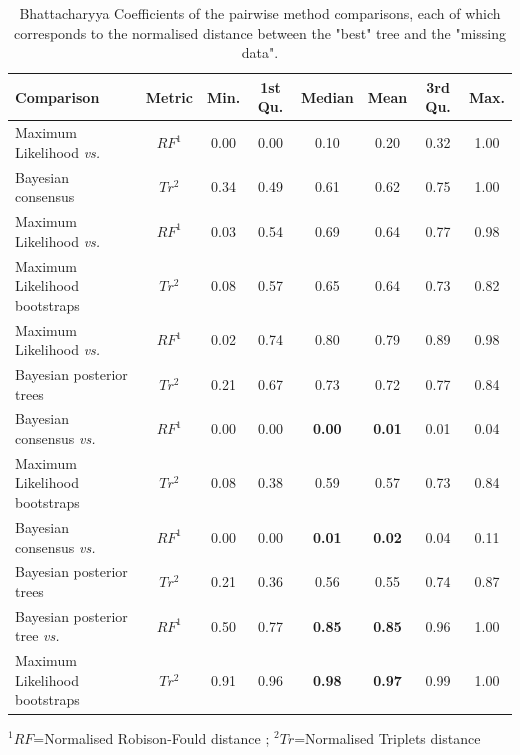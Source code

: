 \documentclass[12pt,letterpaper]{article}
\begin{document}
\begin{table}[ht]
\caption{Bhattacharyya Coefficients of the pairwise method comparisons, each of which corresponds to the normalised distance between the "best" tree and the "missing data".}
\centering
\begin{tabular}{lccccccc}
  \hline
 Comparison &  Metric & Min. & 1st Qu. & Median & Mean & 3rd Qu. & Max. \\ 
  \hline
    Maximum Likelihood \textit{vs.} & $RF^1$ & 0.00 & 0.00 & 0.10 & 0.20 & 0.32 & 1.00 \\ 
    Bayesian consensus              & $Tr^2$ & 0.34 & 0.49 & 0.61 & 0.62 & 0.75 & 1.00 \\ 
    Maximum Likelihood \textit{vs.} & $RF^1$ & 0.03 & 0.54 & 0.69 & 0.64 & 0.77 & 0.98 \\ 
    Maximum Likelihood bootstraps   & $Tr^2$ & 0.08 & 0.57 & 0.65 & 0.64 & 0.73 & 0.82 \\ 
    Maximum Likelihood \textit{vs.} & $RF^1$ & 0.02 & 0.74 & 0.80 & 0.79 & 0.89 & 0.98 \\ 
    Bayesian posterior trees        & $Tr^2$ & 0.21 & 0.67 & 0.73 & 0.72 & 0.77 & 0.84 \\ 
    Bayesian consensus \textit{vs.} & $RF^1$ & 0.00 & 0.00 & \textbf{0.00} & \textbf{0.01} & 0.01 & 0.04 \\ 
    Maximum Likelihood bootstraps   & $Tr^2$ & 0.08 & 0.38 & 0.59 & 0.57 & 0.73 & 0.84 \\ 
    Bayesian consensus \textit{vs.} & $RF^1$ & 0.00 & 0.00 & \textbf{0.01} & \textbf{0.02} & 0.04 & 0.11 \\ 
    Bayesian posterior trees        & $Tr^2$ & 0.21 & 0.36 & 0.56 & 0.55 & 0.74 & 0.87 \\ 
    Bayesian posterior tree \textit{vs.}  & $RF^1$ & 0.50 & 0.77 & \textbf{0.85} & \textbf{0.85} & 0.96 & 1.00 \\ 
    Maximum Likelihood bootstraps   & $Tr^2$ & 0.91 & 0.96 & \textbf{0.98} & \textbf{0.97} & 0.99 & 1.00 \\ 
   \hline
\end{tabular}
   $^1RF$=Normalised Robison-Fould distance ; $^2Tr$=Normalised Triplets distance
\label{Tab_Results-Difference_methods}
\end{table}


\end{document}

